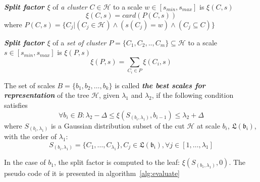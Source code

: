 \begin{definition}
\label{def:split_factor} \textbf{\textit{Split factor $\xi$}} of \textit{a cluster} $C \in \mathcal{H}$ to a scale $w \in [s_{min},s_{max}]$ is $\xi(C,s)$
\begin{equation}
\xi(C,s) = card(P(C,s))
\end{equation}
where $P(C,s) = \{ C_j | (C_j \in \mathcal{H}) \wedge (s(C_j) = w) \wedge (C_j \subseteq C) \}$ 
\end{definition}
\begin{definition}
\label{def:split_factor_set} \textbf{\textit{Split factor $\xi$}} of a \textit{set of cluster} $P=\{C_1, C_2,.., C_m\} \subseteq \mathcal{H}$ to a scale $s \in [s_{min},s_{max}]$ is $\xi(P,s)$
\begin{equation}
\xi(P,s) = \sum_{C_i \in P}\xi(C_i,s)
\end{equation}
\end{definition}
\begin{definition}
\label{def:best_scales} The set of scales $\mathsf{\textit{B}} = \{b_1, b_2, \ldots, b_k\}$ is called \textbf{\textit{the best scales for representation}} of the tree $\mathcal{H}$, given $\lambda_1$ and $\lambda_2$, if the following condition satisfies
\begin{equation}
\label{equ:best_scale}
\forall b_i \in \mathsf{\textit{B}}: \lambda_2 - \Delta \leq \xi(S_{(b_i,\lambda_1)},b_{i-1}) \leq \lambda_2 + \Delta 
\end{equation}
where $S_{(b_i,\lambda_1)}$ is a Gaussian distribution subset of the cut $\mathcal{H}$ at scale $b_i$, $\mathfrak{L(b_i)}$, with the order of $\lambda_1$:
\begin{equation}
S_{(b_i,\lambda_1)} = \{C_1, \ldots, C_{\lambda_1}\}, C_j \in \mathfrak{L(b_i)}, \forall j \in [1, \ldots, \lambda_1] 
\end{equation}
\end{definition}
In the case of $b_1$, the split factor is computed to the leaf: $\xi(S_{(b_1,\lambda_1)},0)$. The pseudo code of it is presented in algorithm~\ref{alg:evaluate}
